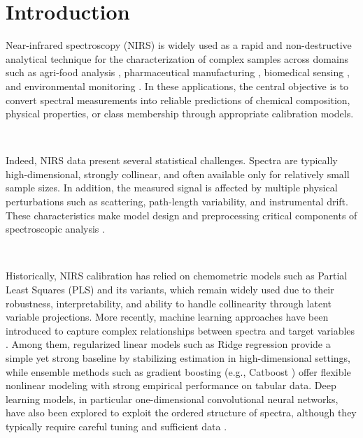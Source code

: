 \documentclass{article}
\begin{document}
\section{Introduction}

Near-infrared spectroscopy (NIRS) is widely used as a rapid and non-destructive analytical technique for the characterization of complex samples across domains such as agri-food analysis \cite{nirs_food_analysis, Pandiselvam2022NIRFood}, pharmaceutical manufacturing \cite{jamrogiewicz_application_2012}, biomedical sensing \cite{nirs_biomedical_sensing}, and environmental monitoring \cite{nirs_environmental_monitoring}. In these applications, the central objective is to convert spectral measurements into reliable predictions of chemical composition, physical properties, or class membership through appropriate calibration models. 

~

Indeed, NIRS data present several statistical challenges. Spectra are typically high-dimensional, strongly collinear, and often available only for relatively small sample sizes. In addition, the measured signal is affected by multiple physical perturbations such as scattering, path-length variability, and instrumental drift. These characteristics make model design and preprocessing critical components of spectroscopic analysis \cite{Rinnan2009Preprocessing}.

~

Historically, NIRS calibration has relied on chemometric models such as Partial Least Squares (PLS) \cite{Wold2001PLS} and its variants, which remain widely used due to their robustness, interpretability, and ability to handle collinearity through latent variable projections. More recently, machine learning approaches have been introduced to capture complex relationships between spectra and target variables \cite{ li_near-infrared_2025, liu_predicting_2026, Pasquini2018NIR,Zhang2022NIRReview}. Among them, regularized linear models such as Ridge regression \cite{hoerl_ridge_1970} provide a simple yet strong baseline by stabilizing estimation in high-dimensional settings, while ensemble methods such as gradient boosting (e.g., Catboost \cite{Prokhorenkova2019CatBoost}) offer flexible nonlinear modeling with strong empirical performance on tabular data. Deep learning models, in particular one-dimensional convolutional neural networks, have also been explored to exploit the ordered structure of spectra, although they typically require careful tuning and sufficient data \cite{nicon_yam, Mishra2022DLNIR}.
\end{document}
